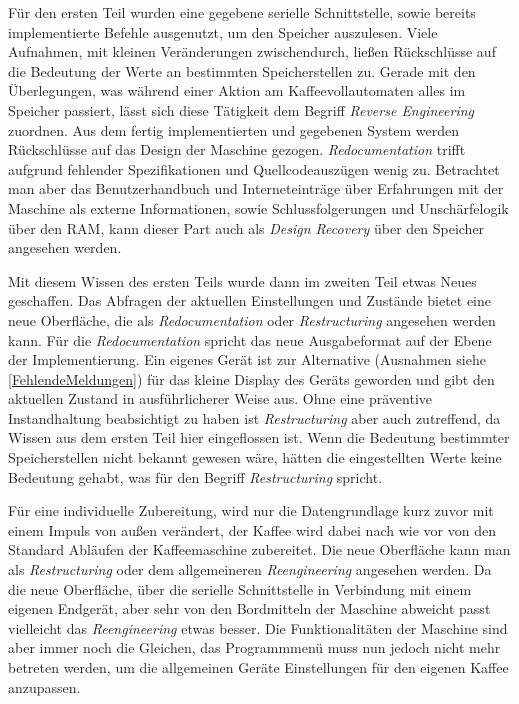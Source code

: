 Für den ersten Teil wurden eine gegebene serielle Schnittstelle, sowie bereits implementierte Befehle ausgenutzt, um den Speicher auszulesen. Viele Aufnahmen, mit kleinen Veränderungen zwischendurch, ließen Rückschlüsse auf die Bedeutung der Werte an bestimmten Speicherstellen zu. Gerade mit den Überlegungen, was während einer Aktion am Kaffeevollautomaten alles im Speicher passiert, lässt sich diese Tätigkeit dem Begriff \textit{Reverse Engineering} zuordnen. Aus dem fertig implementierten und gegebenen System werden Rückschlüsse auf das Design der Maschine gezogen. \textit{Redocumentation} trifft aufgrund fehlender Spezifikationen und Quellcodeauszügen wenig zu. Betrachtet man aber das Benutzerhandbuch und Interneteinträge über Erfahrungen mit der Maschine als externe Informationen, sowie Schlussfolgerungen und Unschärfelogik über den \ac{RAM}, kann dieser Part auch als \textit{Design Recovery} über den Speicher angesehen werden.

Mit diesem Wissen des ersten Teils wurde dann im zweiten Teil etwas Neues geschaffen. Das Abfragen der aktuellen Einstellungen und Zustände bietet eine neue Oberfläche, die als \textit{Redocumentation} oder \textit{Restructuring} angesehen werden kann. Für die \textit{Redocumentation} spricht das neue Ausgabeformat auf der Ebene der Implementierung. Ein eigenes Gerät ist zur Alternative (Ausnahmen siehe \ref{FehlendeMeldungen}) für das kleine Display des Geräts geworden und gibt den aktuellen Zustand in ausführlicherer Weise aus. Ohne eine präventive Instandhaltung beabsichtigt zu haben ist \textit{Restructuring} aber auch zutreffend, da Wissen aus dem ersten Teil hier eingeflossen ist. Wenn die Bedeutung bestimmter Speicherstellen nicht bekannt gewesen wäre, hätten die eingestellten Werte keine Bedeutung gehabt, was für den Begriff \textit{Restructuring} spricht.

Für eine individuelle Zubereitung, wird nur die Datengrundlage kurz zuvor mit einem Impuls von außen verändert, der Kaffee wird dabei nach wie vor von den Standard Abläufen der Kaffeemaschine zubereitet. Die neue Oberfläche kann man als \textit{Restructuring} oder dem allgemeineren \textit{Reengineering} angesehen werden. Da die neue Oberfläche, über die serielle Schnittstelle in Verbindung mit einem eigenen Endgerät, aber sehr von den Bordmitteln der Maschine abweicht passt vielleicht das \textit{Reengineering} etwas besser. Die Funktionalitäten der Maschine sind aber immer noch die Gleichen, das Programmmenü muss nun jedoch nicht mehr betreten werden, um die allgemeinen Geräte Einstellungen für den eigenen Kaffee anzupassen.

